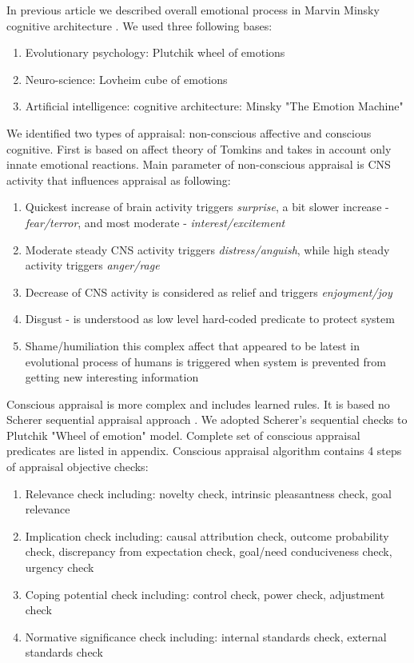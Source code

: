 In previous article \cite{computational_emotional_thinking} we described overall emotional process in Marvin Minsky cognitive architecture \cite{emotionmachine}. We used three following bases:

\begin{enumerate}
 \item  Evolutionary psychology: Plutchik wheel of emotions\cite{natureofemotions}
 \item  Neuro-science: Lovheim cube of emotions \cite{cubeofemotions}
 \item  Artificial intelligence: cognitive architecture: Minsky "The Emotion Machine" \cite{emotionmachine}
\end{enumerate}


We identified two types of appraisal: non-conscious affective and conscious cognitive. First is based on affect theory of Tomkins \cite{primer_affect_psychology} and takes in account only innate emotional reactions. Main parameter of non-conscious appraisal is CNS activity that influences appraisal as following:

\begin{enumerate}
 \item  Quickest increase of brain activity triggers \emph{surprise}, a bit slower increase - \emph{fear/terror}, and most moderate - \emph{interest/excitement}
 \item  Moderate steady CNS activity triggers \emph{distress/anguish}, while high steady activity triggers \emph{anger/rage}
 \item  Decrease of CNS activity is considered as relief and triggers \emph{enjoyment/joy}
 \item  Disgust - is understood as low level hard-coded predicate to protect system
 \item  Shame/humiliation this complex affect that appeared to be latest in evolutional process of humans is triggered when system is prevented from getting new interesting information
\end{enumerate}

Conscious appraisal is more complex and includes learned rules. It is based no Scherer sequential appraisal approach \cite{appraisal_considered_as_a_process}. We adopted Scherer's sequential checks to Plutchik "Wheel of emotion" \cite{natureofemotions} model. Complete set of conscious appraisal predicates are listed in appendix. Conscious appraisal algorithm contains 4 steps of appraisal objective checks:

\begin{enumerate}
 \item  Relevance check including: novelty check, intrinsic pleasantness check, goal relevance
 \item  Implication check including: causal attribution check, outcome probability check, discrepancy from expectation check, goal/need conduciveness check, urgency check
 \item  Coping potential check including: control check, power check, adjustment check
 \item  Normative significance check including: internal standards check, external standards check
\end{enumerate}


